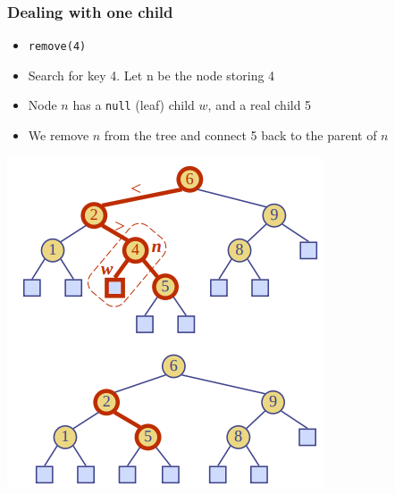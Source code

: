 \documentclass{article}
\begin{document}
	\subsubsection{Dealing with one child}
	\begin{multicols}{2}
		\begin{itemize}
			\item \texttt{remove(4)}
			\item Search for key 4. Let n be the node storing 4
			\item Node $n$ has a \texttt{null} (leaf) child $w$, and a real child 5
			\item We remove $n$ from the tree and connect 5 back to the parent of $n$
		\end{itemize}
		\begin{center}
			\includegraphics[scale=0.4]{binary_remove_1_child.png}		
		\end{center}
	\end{multicols}
	
\end{document}
